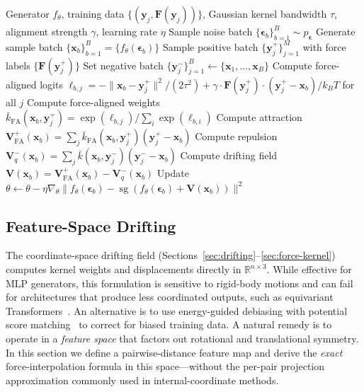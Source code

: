 \documentclass[11pt]{article}
\newcommand{\bx}{\mathbf{x}}
\newcommand{\by}{\mathbf{y}}
\newcommand{\bV}{\mathbf{V}}
\newcommand{\bF}{\mathbf{F}}
\newcommand{\beps}{\boldsymbol{\epsilon}}
\newcommand{\R}{\mathbb{R}}
\newcommand{\kbar}{\bar{k}}
\newcommand{\sg}{\operatorname{sg}}
\newcommand{\kBT}{k_BT}
\begin{document}
\begin{algorithm}[t]
\caption{Force-Aligned Kernel Drifting Training (Coordinate Space)}
\label{alg:force-aligned}
\begin{algorithmic}[1]
\REQUIRE Generator $f_\theta$, training data $\{(\by_j, \bF(\by_j))\}$, Gaussian kernel bandwidth $\tau$, alignment strength $\gamma$, learning rate $\eta$
    \STATE Sample noise batch $\{\beps_b\}_{b=1}^B \sim p_{\beps}$
    \STATE Generate sample batch $\{\bx_b\}_{b=1}^B = \{f_\theta(\beps_b)\}$  
    \STATE Sample positive batch $\{\by_j^+\}_{j=1}^M$ with force labels $\{\bF(\by_j^+)\}$
    \STATE Set negative batch $\{\by_j^-\}_{j=1}^B \leftarrow \{\bx_1, \ldots, \bx_B\}$ 
        \STATE Compute force-aligned logits $\ell_{b,j} = {-\|\bx_b-\by_j^+\|^2}/{(2\tau^2)} + \gamma \cdot {\bF(\by_j^+) \cdot (\by_j^+ - \bx_b)}/{\kBT}$ for all $j$
        \STATE Compute force-aligned weights $\kbar_{\text{FA}}(\bx_b, \by_j^+) = \exp(\ell_{b,j}) / \sum_i \exp(\ell_{b,i})$
        \STATE Compute attraction $\bV_{\text{FA}}^+(\bx_b) = \sum_j \kbar_{\text{FA}}(\bx_b,\by_j^+)(\by_j^+ - \bx_b)$
        \STATE Compute repulsion $\bV_q^-(\bx_b) = \sum_j \kbar(\bx_b,\by_j^-)(\by_j^- - \bx_b)$ 
        \STATE Compute drifting field $\bV(\bx_b) = \bV_{\text{FA}}^+(\bx_b) - \bV_q^-(\bx_b)$
        \STATE Update $\theta \leftarrow \theta - \eta\nabla_\theta \|f_\theta(\beps_b) - \sg(f_\theta(\beps_b) + \bV(\bx_b))\|^2$
    \ENDFOR
\ENDWHILE
\end{algorithmic}
\end{algorithm}


\subsection{Feature-Space Drifting}
\label{sec:feature-drift}

The coordinate-space drifting field (Sections~\ref{sec:drifting}--\ref{sec:force-kernel}) computes kernel weights and displacements directly in $\R^{n \times 3}$.
While effective for MLP generators, this formulation is sensitive to rigid-body motions and can fail for architectures that produce less coordinated outputs, such as equivariant Transformers~\citep{liao2024equiformerv2}.
An alternative is to use energy-guided debiasing with potential score matching~\citep{guo2025potential} to correct for biased training data.
A natural remedy is to operate in a \emph{feature space} that factors out rotational and translational symmetry.
In this section we define a pairwise-distance feature map and derive the \emph{exact} force-interpolation formula in this space---without the per-pair projection approximation commonly used in internal-coordinate methods.
\end{document}
